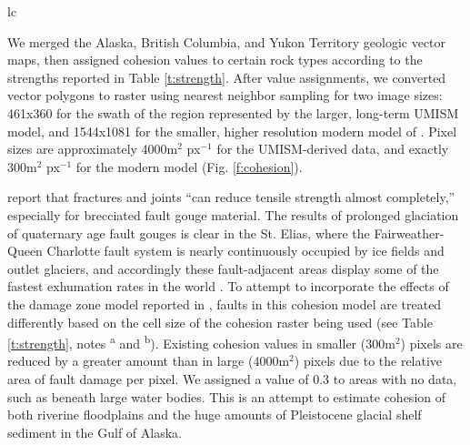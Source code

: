 \documentclass[twocolumn]{aastex6}
\begin{document}
\begin{deluxetable}{lc}
		
		
		
	\end{deluxetable}

		We merged the Alaska, British Columbia, and Yukon Territory geologic vector maps, then assigned cohesion values to certain rock types according to the strengths reported in Table \ref{t:strength}. After value assignments, we converted vector polygons to raster using nearest neighbor sampling for two image sizes: 461x360 for the swath of the region represented by the larger, long-term UMISM model, and 1544x1081 for the smaller, higher resolution modern model of \citet{Altena2018}. Pixel sizes are approximately 4000m$^2$ px$^{-1}$ for the UMISM-derived data, and exactly 300m$^2$ px$^{-1}$ for the modern model (Fig. \ref{f:cohesion}).

		\citet{Roy2015} report that fractures and joints ``can reduce tensile strength almost completely,'' especially for brecciated fault gouge material. The results of prolonged glaciation of quaternary age fault gouges is clear in the St. Elias, where the Fairweather-Queen Charlotte fault system is nearly continuously occupied by ice fields and outlet glaciers, and accordingly these fault-adjacent areas display some of the fastest exhumation rates in the world \citep{Sheaf2003,Spotila2004,Enkelmann2008,Berger2008,Enkelmann2009,Elmore2013,Enkelmann2015}. To attempt to incorporate the effects of the damage zone model reported in \citet{Roy2015}, faults in this cohesion model are treated differently based on the cell size of the cohesion raster being used (see Table \ref{t:strength}, notes \textsuperscript{a} and \textsuperscript{b}). Existing cohesion values in smaller (300m$^2$) pixels are reduced by a greater amount than in large (4000m$^2$) pixels due to the relative area of fault damage per pixel. We assigned a value of 0.3 to areas with no data, such as beneath large water bodies. This is an attempt to estimate cohesion of both riverine floodplains and the huge amounts of Pleistocene glacial shelf sediment in the Gulf of Alaska.
\end{document}
